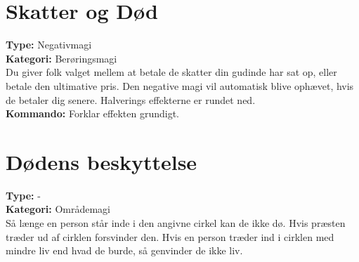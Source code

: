 \section{Skatter og Død}
\textbf{Type:} Negativmagi\\ 
\textbf{Kategori:} Berøringsmagi\\
Du giver folk valget mellem at betale de skatter din gudinde har sat op, eller betale den ultimative pris. Den negative magi vil automatisk blive ophævet, hvis de betaler dig senere. Halverings effekterne er rundet ned.\\
\textbf{Kommando:} Forklar effekten grundigt.

\section{Dødens beskyttelse}
\textbf{Type:} - \\
\textbf{Kategori:} Områdemagi\\
Så længe en person står inde i den angivne cirkel kan de ikke dø. Hvis præsten træder ud af cirklen forsvinder den. Hvis en person træder ind i cirklen med mindre liv end hvad de burde, så genvinder de ikke liv.

